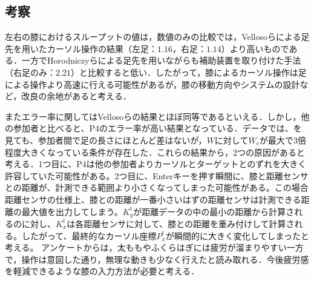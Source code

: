 \documentclass[submit, techrep]{ipsj}
\begin{document}
\subsection{考察}
左右の膝におけるスループットの値は，数値のみの比較では，Vellosoら\cite{velloso:hal-01599657}による足先を用いたカーソル操作の結果（左足：$1.16$，右足：$1.14$）より高いものである．一方でHorodniczyら\cite{Horodniczy:2017:FHE:3025453.3025625}による足先を用いながらも補助装置を取り付けた手法（右足のみ：$2.21$）と比較すると低い．したがって，膝によるカーソル操作は足による操作より高速に行える可能性があるが，膝の移動方向やシステムの設計など，改良の余地があると考える．\par
またエラー率に関してはVellosoら\cite{velloso:hal-01599657}の結果とほぼ同等であるといえる．しかし，他の参加者と比べると、P4のエラー率が高い結果となっている．データでは、を見ても、参加者間で足の長さにほとんど差はないが，$W$に対して$W_e$が最大で3倍程度大きくなっている条件が存在した．これらの結果から，2つの原因があると考える．1つ目に、P4は他の参加者よりカーソルとターゲットとのずれを大きく許容していた可能性がある。2つ目に、Enterキーを押す瞬間に、膝と距離センサとの距離が、計測できる範囲より小さくなってしまった可能性がある。この場合距離センサの仕様上、膝との距離が一番小さいはずの距離センサは計測できる距離の最大値を出力してしまう。$K^t_y$が距離データの中の最小の距離から計算されるのに対し、$K^t_x$は各距離センサに対して、膝との距離を重み付けして計算される。したがって、最終的なカーソル座標$P^t_x$が瞬間的に大きく変化してしまったと考える。
アンケートからは，太ももやふくらはぎには疲労が溜まりやすい一方で，操作は意図した通り，無理な動きも少なく行えたと読み取れる．今後疲労感を軽減できるような膝の入力方法が必要と考える．

\end{document}
